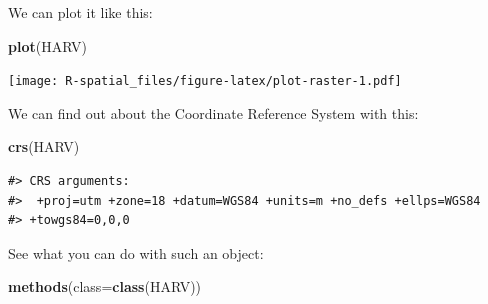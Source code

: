 \documentclass[]{book}
\newenvironment{Shaded}{\begin{snugshade}}{\end{snugshade}}
\newcommand{\KeywordTok}[1]{\textcolor[rgb]{0.13,0.29,0.53}{\textbf{#1}}}
\newcommand{\DataTypeTok}[1]{\textcolor[rgb]{0.13,0.29,0.53}{#1}}
\newcommand{\NormalTok}[1]{#1}
\theoremstyle{definition}
\theoremstyle{definition}
\theoremstyle{definition}
\theoremstyle{remark}
\begin{document}
We can plot it like this:

\begin{Shaded}
\begin{Highlighting}[]
\KeywordTok{plot}\NormalTok{(HARV)}
\end{Highlighting}
\end{Shaded}

\texttt{[image: R-spatial\_files/figure-latex/plot-raster-1.pdf]}

We can find out about the Coordinate Reference System with this:

\begin{Shaded}
\begin{Highlighting}[]
\KeywordTok{crs}\NormalTok{(HARV)}
\end{Highlighting}
\end{Shaded}

\begin{verbatim}
#> CRS arguments:
#>  +proj=utm +zone=18 +datum=WGS84 +units=m +no_defs +ellps=WGS84
#> +towgs84=0,0,0
\end{verbatim}

See what you can do with such an object:

\begin{Shaded}
\begin{Highlighting}[]
\KeywordTok{methods}\NormalTok{(}\DataTypeTok{class=}\KeywordTok{class}\NormalTok{(HARV))}
\end{Highlighting}
\end{Shaded}
\end{document}
